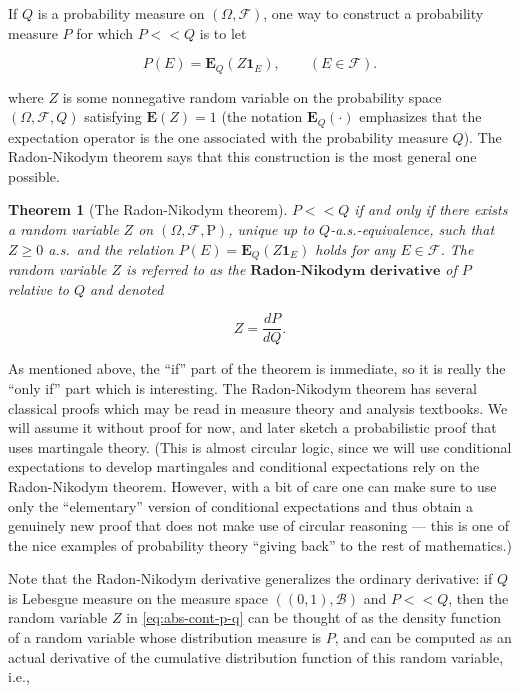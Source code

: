 \documentclass[11pt]{report}
\theoremstyle{plain}
\newtheorem{thm}{Theorem}[chapter]
\theoremstyle{definition}
\begin{document}
\noindent If $Q$ is a probability measure on
$(\Omega, \mathcal{F})$, one way to construct a
probability measure $P$ for which $P<<Q$ is to let

\begin{equation*} \tag{5}\label{eq:abs-cont-p-q}
P(E) = \mathbf{E}_{Q}(Z \mathbf{1}_E), \qquad (E\in \mathcal{F}).
\end{equation*}

\noindent where $Z$ is some nonnegative random variable on the
probability space $(\Omega,\mathcal{F},Q)$ satisfying
$\mathbf{E}(Z)=1$ (the notation
$\mathbf{E}_{Q}(\cdot)$ emphasizes that the
expectation operator is the one associated with the
probability measure $Q$). The Radon-Nikodym theorem
says that this construction is the most general one
possible.

\begin{thm}[The Radon-Nikodym theorem]
$P<<Q$ if and only if there exists a random variable
$Z$ on $(\Omega, \mathcal{F}, \mathrm{P})$, unique up
to $Q$-a.s.-equivalence, such that $Z\ge 0$ a.s.\ and
the relation $P(E) = \mathbf{E}_{Q} (Z \mathbf{1}_E)$
holds for any $E\in \mathcal{F}$. The random variable
$Z$ is referred to as the
$\textbf{Radon-Nikodym derivative}$ of $P$ relative
to $Q$ and denoted

\[
Z = \frac{dP}{dQ}.
\]

\end{thm}

\noindent As mentioned above, the ``if'' part of the theorem is
immediate, so it is really the ``only if'' part which
is interesting. The Radon-Nikodym theorem has several
classical proofs which may be read in measure theory
and analysis textbooks. We will assume it without
proof for now, and later sketch a probabilistic proof
that uses martingale theory. (This is almost circular
logic, since we will use conditional expectations to
develop martingales and conditional expectations rely
on the Radon-Nikodym theorem. However, with a bit of
care one can make sure to use only the ``elementary''
version of conditional expectations and thus obtain a
genuinely new proof that does not make use of circular
reasoning --- this is one of the nice examples of
probability theory ``giving back'' to the rest of
mathematics.)

Note that the Radon-Nikodym derivative generalizes
the ordinary derivative: if $Q$ is Lebesgue measure
on the measure space $((0,1),\mathcal{B})$ and $P<<Q$,
then the random variable $Z$ in \eqref{eq:abs-cont-p-q}
can be thought of as the density function of a random
variable whose distribution measure is $P$, and can
be computed as an actual derivative of the cumulative
distribution function of this random variable, i.e.,
\end{document}
